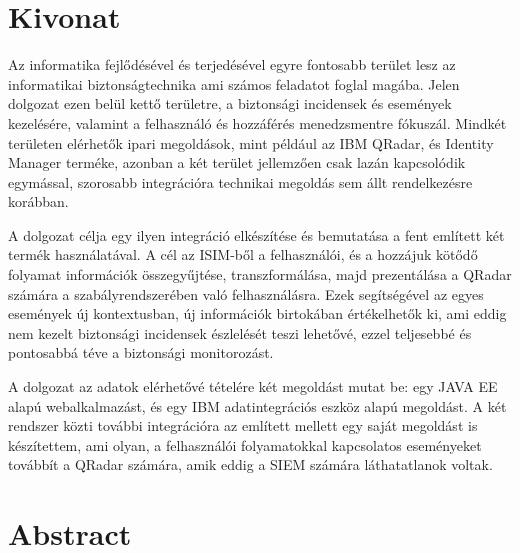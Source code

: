 \setcounter{page}{1}

\selecthungarian

\chapter*{Kivonat}

Az informatika fejlődésével és terjedésével egyre fontosabb terület lesz az informatikai biztonságtechnika ami számos feladatot foglal magába. Jelen dolgozat ezen belül kettő területre, a biztonsági incidensek és események kezelésére, valamint a felhasználó és hozzáférés menedzsmentre fókuszál. Mindkét területen elérhetők ipari megoldások, mint például az IBM QRadar, és Identity Manager terméke, azonban a két terület jellemzően csak lazán kapcsolódik egymással, szorosabb integrációra technikai megoldás sem állt rendelkezésre korábban.

A dolgozat célja egy ilyen integráció elkészítése és bemutatása a fent említett két termék használatával. A cél az ISIM-ből a felhasználói, és a hozzájuk kötődő folyamat információk összegyűjtése, transzformálása, majd prezentálása a QRadar számára a szabályrendszerében való felhasználásra. Ezek segítségével az egyes események új kontextusban, új információk birtokában értékelhetők ki, ami eddig nem kezelt biztonsági incidensek észlelését teszi lehetővé, ezzel teljesebbé és pontosabbá téve a biztonsági monitorozást.


A dolgozat az adatok elérhetővé tételére két megoldást mutat be: egy JAVA EE alapú webalkalmazást, és egy IBM adatintegrációs eszköz alapú megoldást. A két rendszer közti további integrációra az említett mellett egy saját megoldást is készítettem, ami olyan, a felhasználói folyamatokkal kapcsolatos eseményeket továbbít a QRadar számára, amik eddig a SIEM számára láthatatlanok voltak.

\vfill
\selectenglish

\chapter*{Abstract}

